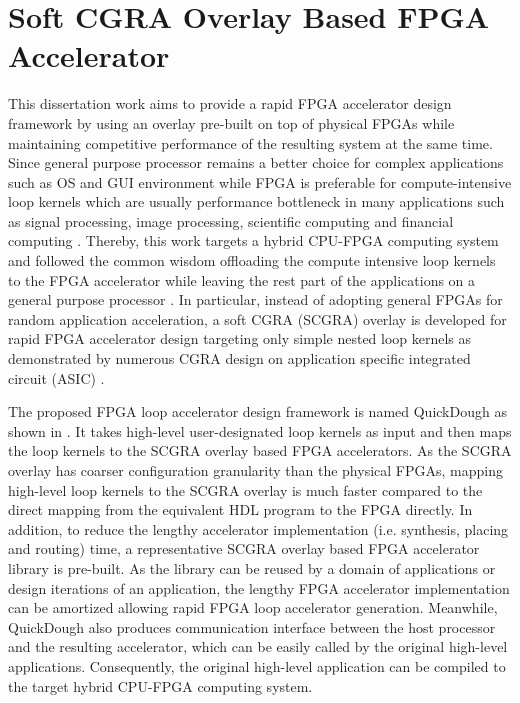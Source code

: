 \section{Soft CGRA Overlay Based FPGA Accelerator}
This dissertation work aims to provide a rapid FPGA accelerator design framework by using an overlay pre-built on top of physical FPGAs while maintaining competitive performance of the resulting system at the same time. Since general purpose processor remains a better choice for complex applications such as OS and GUI environment while FPGA is preferable for compute-intensive loop kernels which are usually performance bottleneck in many applications such as signal processing, image processing, scientific computing and financial computing \cite{sukhsawas2004high, bouris2010fast, wu2009fine, tian2008high}. Thereby, this work targets a hybrid CPU-FPGA computing system and followed the common wisdom offloading the compute intensive loop kernels to the FPGA accelerator while leaving the rest part of the applications on a general purpose processor \cite{baleani2002HW-SW, canis2011legup}. In particular, instead of adopting general FPGAs for random application acceleration, a soft CGRA (SCGRA) overlay is developed for rapid FPGA accelerator design targeting only simple nested loop kernels as demonstrated by numerous CGRA design on application specific integrated circuit (ASIC) \cite{compton2002reconfigurable, tessier2001reconfigurable}.  

The proposed FPGA loop accelerator design framework is named QuickDough as shown in . It takes high-level user-designated loop kernels as input and then maps the loop kernels to the SCGRA overlay based FPGA accelerators. As the SCGRA overlay has coarser configuration granularity than the physical FPGAs, mapping high-level loop kernels to the SCGRA overlay is much faster compared to the direct mapping from the equivalent HDL program to the FPGA directly. In addition, to reduce the lengthy accelerator implementation (i.e. synthesis, placing and routing) time, a representative SCGRA overlay based FPGA accelerator library is pre-built. As the library can be reused by a domain of applications or design iterations of an application, the lengthy FPGA accelerator implementation can be amortized allowing rapid FPGA loop accelerator generation. Meanwhile, QuickDough also produces communication interface between the host processor and the resulting accelerator, which can be easily called by the original high-level applications. Consequently, the original high-level application can be compiled to the target hybrid CPU-FPGA computing system.

